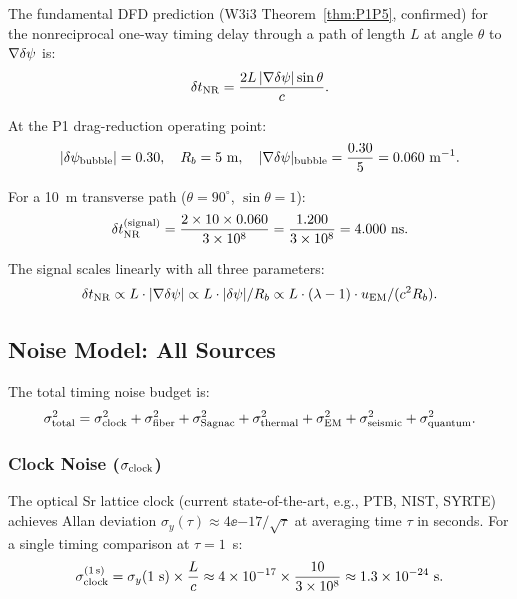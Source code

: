The fundamental DFD prediction (W3i3 Theorem~\ref{thm:P1P5}, confirmed) for
the nonreciprocal one-way timing delay through a path of length $L$ at angle
$\theta$ to $\nabla\delta\psi$ is:
\begin{equation}
\delta t_{\rm NR} = \frac{2L\,|\nabla\delta\psi|\sin\theta}{c}.
\label{eq:NR_delay}
\end{equation}

At the P1 drag-reduction operating point:
\begin{equation}
|\delta\psi_{\rm bubble}| = 0.30, \quad R_b = 5~\text{m}, \quad
|\nabla\delta\psi|_{\rm bubble} = \frac{0.30}{5} = 0.060~\text{m}^{-1}.
\label{eq:bubble_params}
\end{equation}

For a 10~m transverse path ($\theta = 90^\circ$, $\sin\theta = 1$):
\begin{equation}
\delta t_{\rm NR}^{(\rm signal)} = \frac{2 \times 10 \times 0.060}{3\times 10^{8}}
= \frac{1.200}{3\times 10^{8}} = 4.000~\text{ns}.
\label{eq:signal_value}
\end{equation}

The signal scales linearly with all three parameters:
\begin{equation}
\delta t_{\rm NR} \propto L \cdot |\nabla\delta\psi| \propto L \cdot |\delta\psi| / R_b
\propto L \cdot (\lambda - 1) \cdot u_{\rm EM} / (c^2 R_b).
\label{eq:signal_scaling}
\end{equation}

\subsection{Noise Model: All Sources}
\label{ssec:noise}

The total timing noise budget is:
\begin{equation}
\sigma_{\rm total}^2 = \sigma_{\rm clock}^2 + \sigma_{\rm fiber}^2
+ \sigma_{\rm Sagnac}^2 + \sigma_{\rm thermal}^2 + \sigma_{\rm EM}^2
+ \sigma_{\rm seismic}^2 + \sigma_{\rm quantum}^2.
\label{eq:noise_budget}
\end{equation}

\subsubsection{Clock Noise ($\sigma_{\rm clock}$)}

The optical Sr lattice clock (current state-of-the-art, e.g., PTB, NIST,
SYRTE) achieves Allan deviation $\sigma_y(\tau) \approx 4\ee{-17}/\sqrt{\tau}$
at averaging time $\tau$ in seconds. For a single timing comparison at
$\tau = 1$~s:
\begin{equation}
\sigma_{\rm clock}^{(1\,\text{s})} = \sigma_y(1~\text{s}) \times \frac{L}{c}
\approx 4\times 10^{-17} \times \frac{10}{3\times 10^{8}} \approx 1.3\times 10^{-24}~\text{s}.
\label{eq:clock_noise_abs}
\end{equation}

